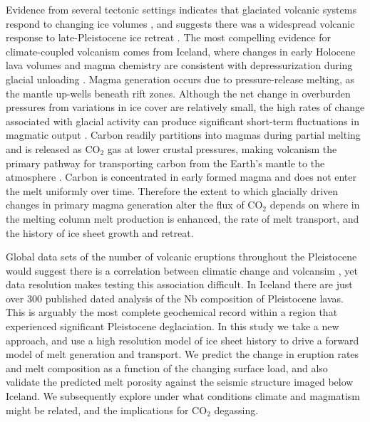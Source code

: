 \documentclass[draft,linenumbers]{agujournal2018}
\begin{document}
Evidence from several tectonic settings indicates that glaciated volcanic systems respond to changing ice volumes \citep{sigvaldason-etal-1992,jull-1996,maclennan-etal-2002,glazner-etal-1999,jellinek-etal-2004,rawson-etal-2016}, and suggests there was a widespread volcanic response to late-Pleistocene ice retreat \citep{huybers-2009}. The most compelling evidence for climate-coupled volcanism comes from Iceland, where changes in early Holocene lava volumes and magma chemistry are consistent with depressurization during glacial unloading \citep{jull-1996,maclennan-etal-2002,sinton-etal-2005}. Magma generation occurs due to pressure-release melting, as the mantle up-wells beneath rift zones. Although the net change in overburden pressures from variations in ice cover are relatively small, the high rates of change associated with glacial activity can produce significant short-term fluctuations in magmatic output \citep{huybers-2009,lund-2011,crowley-etal-2015,burley-2015}. Carbon readily partitions into magmas during partial melting \citep{rosenthal-etal-2015} and is released as CO$_{2}$ gas at lower crustal pressures, making volcanism the primary pathway for transporting carbon from the Earth's mantle to the atmosphere \citep{dasgupta-2010}. Carbon is concentrated in early formed magma and does not enter the melt uniformly over time. Therefore the extent to which glacially driven changes in primary magma generation alter the flux of CO$_{2}$ depends on where in the melting column melt production is enhanced, the rate of melt transport, and the history of ice sheet growth and retreat.

Global data sets of the number of volcanic eruptions throughout the Pleistocene would suggest there is a correlation between climatic change and volcansim \citep{huybers-2009}, yet data resolution makes testing this association difficult. In Iceland there are just over 300 published dated analysis of the Nb composition of Pleistocene lavas. This is arguably the most complete geochemical record within a region that experienced significant Pleistocene deglaciation. In this study we take a new approach, and use a high resolution model of ice sheet history to drive a forward model of melt generation and transport. We predict the change in eruption rates and melt composition as a function of the changing surface load, and also validate the predicted melt porosity against the seismic structure imaged below Iceland. We subsequently explore under what conditions climate and magmatism might be related, and the implications for CO$_{2}$ degassing.
\end{document}
